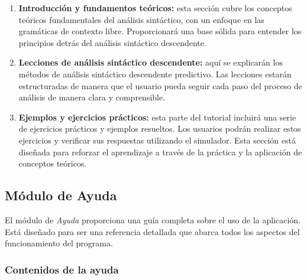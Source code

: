 \begin{enumerate}
    \item \textbf{Introducción y fundamentos teóricos:} esta sección cubre los conceptos teóricos fundamentales del análisis sintáctico, con un enfoque en las gramáticas de contexto libre. Proporcionará una base sólida para entender los principios detrás del análisis sintáctico descendente.

    \item \textbf{Lecciones de análisis sintáctico descendente:} aquí se explicarán los métodos de análisis sintáctico descendente predictivo. Las lecciones estarán estructuradas de manera que el usuario pueda seguir cada paso del proceso de análisis de manera clara y comprensible.

    \item \textbf{Ejemplos y ejercicios prácticos:} esta parte del tutorial incluirá una serie de ejercicios prácticos y ejemplos resueltos. Los usuarios podrán realizar estos ejercicios y verificar sus respuestas utilizando el simulador. Esta sección está diseñada para reforzar el aprendizaje a través de la práctica y la aplicación de conceptos teóricos.
\end{enumerate}

\subsection{Módulo de Ayuda}

El módulo de \textit{Ayuda} proporciona una guía completa sobre el uso de la aplicación. Está diseñado para ser una referencia detallada que abarca todos los aspectos del funcionamiento del programa.

\subsubsection{Contenidos de la ayuda}

